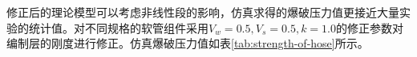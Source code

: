 修正后的理论模型可以考虑非线性段的影响，仿真求得的爆破压力值更接近大量实验的统计值。对不同规格的软管组件采用$ V_w=0.5,V_s=0.5,k=1.0 $的修正参数对编制层的刚度进行修正。仿真爆破压力值如表\ref{tab:strength-of-hose}所示。

\begin{figure}[!htp]
	\centering
	
	\subfigure[]{
}
\end{figure}
